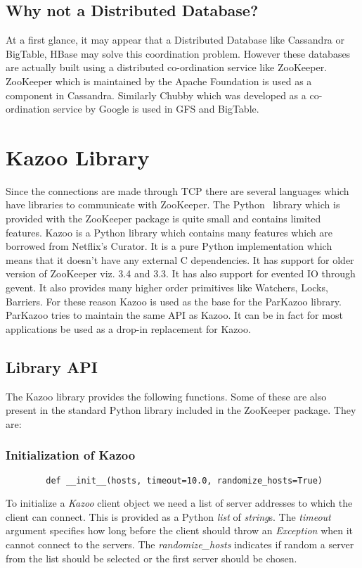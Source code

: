 \subsection{Why not a Distributed Database?}
At a first glance, it may appear that a Distributed Database like Cassandra or BigTable, HBase may solve this coordination problem. However these databases are actually built using a distributed co-ordination service like ZooKeeper. ZooKeeper which is maintained by the Apache Foundation is used as a component in Cassandra. Similarly Chubby which was developed as a co-ordination service by Google is used in GFS and BigTable.

\section{Kazoo Library}
Since the connections are made through TCP there are several languages which have libraries to communicate with ZooKeeper. The Python~\cite{van2002python} library which is provided with the ZooKeeper package is quite small and contains limited features. Kazoo is a Python library which contains many features which are borrowed from Netflix's Curator. It is a pure Python implementation which means that it doesn't have any external C dependencies. It has support for older version of ZooKeeper viz. 3.4 and 3.3. It has also support for evented IO through gevent. It also provides many higher order primitives like Watchers, Locks, Barriers. For these reason Kazoo is used as the base for the ParKazoo library. ParKazoo tries to maintain the same API as Kazoo. It can be in fact for most applications be used as a drop-in replacement for Kazoo.

\subsection{Library API}
The Kazoo library provides the following functions. Some of these are also present in the standard Python library included in the ZooKeeper package. They are:
  \subsubsection{Initialization of Kazoo}
  	\begin{lstlisting}
  		def __init__(hosts, timeout=10.0, randomize_hosts=True)
  	\end{lstlisting}
  	To initialize a \textit{Kazoo} client object we need a list of server addresses to which the client can connect. This is provided as a Python \textit{list} of \textit{string}s. The \textit{timeout} argument specifies how long before the client should throw an \textit{Exception} when it cannot connect to the servers. The \textit{randomize\_hosts} indicates if random a server from the list should be selected or the first server should be chosen.

